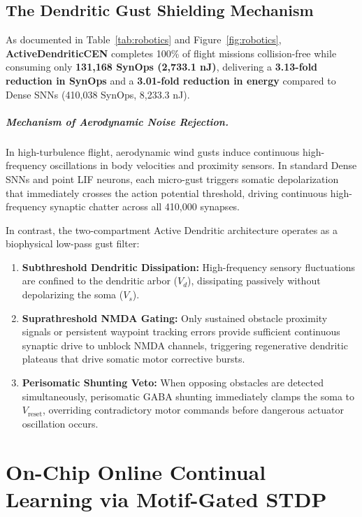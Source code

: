 \documentclass[11pt,letterpaper]{report}
\begin{document}
\section{The Dendritic Gust Shielding Mechanism}

As documented in Table~\ref{tab:robotics} and Figure~\ref{fig:robotics}, \textbf{ActiveDendriticCEN} completes 100\% of flight missions collision-free while consuming only \textbf{131,168 SynOps (2,733.1 nJ)}, delivering a \textbf{3.13-fold reduction in SynOps} and a \textbf{3.01-fold reduction in energy} compared to Dense SNNs (410,038 SynOps, 8,233.3 nJ).

\paragraph{Mechanism of Aerodynamic Noise Rejection.}
In high-turbulence flight, aerodynamic wind gusts induce continuous high-frequency oscillations in body velocities and proximity sensors. In standard Dense SNNs and point LIF neurons, each micro-gust triggers somatic depolarization that immediately crosses the action potential threshold, driving continuous high-frequency synaptic chatter across all 410,000 synapses.

In contrast, the two-compartment Active Dendritic architecture operates as a biophysical low-pass gust filter:
\begin{enumerate}[leftmargin=*]
    \item \textbf{Subthreshold Dendritic Dissipation:} High-frequency sensory fluctuations are confined to the dendritic arbor ($V_d$), dissipating passively without depolarizing the soma ($V_s$).
    \item \textbf{Suprathreshold NMDA Gating:} Only sustained obstacle proximity signals or persistent waypoint tracking errors provide sufficient continuous synaptic drive to unblock NMDA channels, triggering regenerative dendritic plateaus that drive somatic motor corrective bursts.
    \item \textbf{Perisomatic Shunting Veto:} When opposing obstacles are detected simultaneously, perisomatic GABA shunting immediately clamps the soma to $V_{\mathrm{reset}}$, overriding contradictory motor commands before dangerous actuator oscillation occurs.
\end{enumerate}

\newpage

\chapter{On-Chip Online Continual Learning via Motif-Gated STDP}
\end{document}
